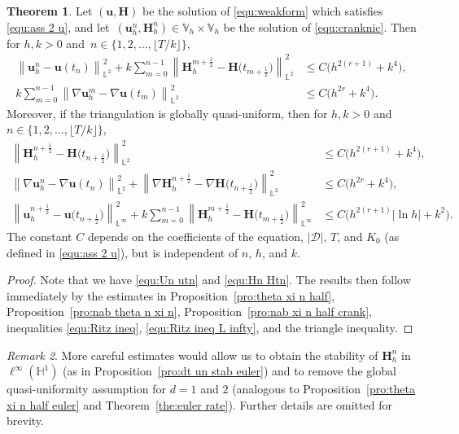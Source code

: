\documentclass[11pt, reqno]{amsart}
\theoremstyle{definition}
\newtheorem{theorem}{Theorem}[section]
\theoremstyle{remark}
\newtheorem{remark}[theorem]{Remark}
\numberwithin{equation}{section}
\newcommand{\bff}{\boldsymbol}
\newcommand{\bb}{\mathbb}
\newcommand{\norm}[2]{\left\|{#1}\right\|_{#2}}
\newcommand{\abs}[1]{\left|{#1}\right|}
\begin{document}
\begin{theorem}\label{the:crank rate}
Let $(\bff{u},\bff{H})$ be the solution of \eqref{equ:weakform} which satisfies \eqref{equ:ass 2 u}, and let~$(\bff{u}_h^n,\bff{H}_h^n)\in \bb{V}_h\times \bb{V}_h$ be the solution of \eqref{equ:cranknic}. Then for $h, k>0$ and~$n\in \{1,2,\ldots,\lfloor T/k \rfloor\}$,
\begin{align*}
	\norm{\bff{u}_h^n - \bff{u}(t_n)}{\bb{L}^2}^2 
	+
	k\sum_{m=0}^{n-1} \norm{\bff{H}_h^{m+\frac12}- \bff{H}\big(t_{m+\frac12}\big)}{\bb{L}^2}^2 
	&\leq
	C \big(h^{2(r+1)} + k^4\big),
	\\
	k \sum_{m=0}^{n-1} \norm{\nabla \bff{u}_h^m- \nabla \bff{u}(t_m)}{\bb{L}^2}^2
	&\leq
	C \big(h^{2r} + k^4\big).
\end{align*}
Moreover, if the triangulation is globally quasi-uniform, then for $h, k>0$ and~$n\in \{1,2,\ldots,\lfloor T/k \rfloor\}$,
\begin{align*}
	\norm{\bff{H}_h^{n+\frac{1}{2}} - \bff{H}\big(t_{n+\frac{1}{2}}\big)}{\bb{L}^2}^2
	&\leq
	C \big(h^{2(r+1)}+k^4 \big),
	\\
	\norm{\nabla \bff{u}_h^n-\nabla \bff{u}(t_n)}{\bb{L}^2}^2
	+
	\norm{\nabla \bff{H}_h^{n+\frac{1}{2}} - \nabla \bff{H}\big(t_{n+\frac{1}{2}}\big)}{\bb{L}^2}^2 
	&\leq
	C \big(h^{2r}+k^4 \big),
	\\
	\norm{\bff{u}_h^{n+\frac12}-\bff{u}\big(t_{n+\frac12}\big)}{\bb{L}^\infty}^2
	+
	k\sum_{m=0}^{n-1} \norm{\bff{H}_h^{m+\frac12}- \bff{H}\big(t_{m+\frac12}\big)}{\bb{L}^\infty}^2
	&\leq
	C \big(h^{2(r+1)} \abs{\ln h} +k^2 \big).
\end{align*}
The constant $C$ depends on the coefficients of the equation, $|\mathscr{D}|$, $T$, and $K_0$ (as defined in \eqref{equ:ass 2 u}), but is independent of $n$, $h$, and $k$.
\end{theorem}

\begin{proof}
Note that we have \eqref{equ:Un utn} and \eqref{equ:Hn Htn}. The results then follow immediately by the estimates in Proposition~\ref{pro:theta xi n half}, Proposition~\ref{pro:nab theta n xi n}, Proposition~\ref{pro:nab xi n half crank}, inequalities \eqref{equ:Ritz ineq}, \eqref{equ:Ritz ineq L infty}, and the triangle inequality.
\end{proof}

\begin{remark}
More careful estimates would allow us to obtain the stability of $\bff{H}_h^n$ in $\ell^\infty(\bb{H}^1)$ (as in Proposition~\ref{pro:dt un stab euler}) and to remove the global quasi-uniformity assumption for $d=1$ and $2$ (analogous to Proposition~\ref{pro:theta xi n half euler} and Theorem~\ref{the:euler rate}). Further details are omitted for brevity.
\end{remark}
\end{document}
